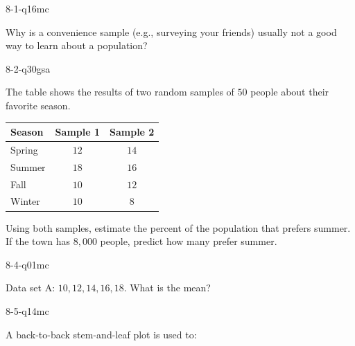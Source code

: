 \begin{practiceQuestion}{8-1-q16}{mc}
\begin{questionText}
Why is a convenience sample (e.g., surveying your friends) usually not a good way to learn about a population?
\end{questionText}
\end{practiceQuestion}

\begin{practiceQuestion}{8-2-q30}{gsa}
\begin{questionText}
The table shows the results of two random samples of $50$ people about their favorite season.

\begin{center}
\begin{tabular}{|l|c|c|}
\hline
\textbf{Season} & \textbf{Sample 1} & \textbf{Sample 2} \\
\hline
Spring & $12$ & $14$ \\
\hline
Summer & $18$ & $16$ \\
\hline
Fall & $10$ & $12$ \\
\hline
Winter & $10$ & $8$ \\
\hline
\end{tabular}
\end{center}

Using both samples, estimate the percent of the population that prefers summer. If the town has $8{,}000$ people, predict how many prefer summer.
\end{questionText}
\end{practiceQuestion}

\begin{practiceQuestion}{8-4-q01}{mc}
\begin{questionText}
Data set A: $10, 12, 14, 16, 18$. What is the mean?
\end{questionText}
\end{practiceQuestion}

\begin{practiceQuestion}{8-5-q14}{mc}
\begin{questionText}
A back-to-back stem-and-leaf plot is used to:
\end{questionText}
\end{practiceQuestion}

